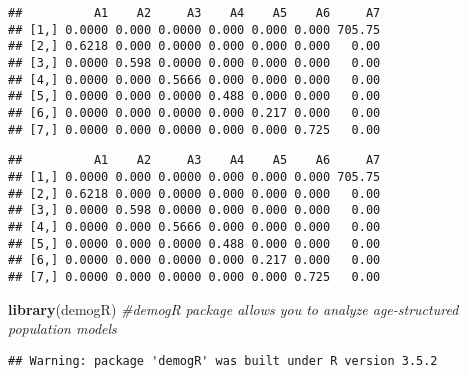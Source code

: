 \documentclass[]{article}
\newenvironment{Shaded}{\begin{snugshade}}{\end{snugshade}}
\newcommand{\KeywordTok}[1]{\textcolor[rgb]{0.13,0.29,0.53}{\textbf{#1}}}
\newcommand{\DecValTok}[1]{\textcolor[rgb]{0.00,0.00,0.81}{#1}}
\newcommand{\CommentTok}[1]{\textcolor[rgb]{0.56,0.35,0.01}{\textit{#1}}}
\newcommand{\OperatorTok}[1]{\textcolor[rgb]{0.81,0.36,0.00}{\textbf{#1}}}
\newcommand{\NormalTok}[1]{#1}
\begin{document}
\begin{verbatim}
##          A1    A2     A3    A4    A5    A6     A7
## [1,] 0.0000 0.000 0.0000 0.000 0.000 0.000 705.75
## [2,] 0.6218 0.000 0.0000 0.000 0.000 0.000   0.00
## [3,] 0.0000 0.598 0.0000 0.000 0.000 0.000   0.00
## [4,] 0.0000 0.000 0.5666 0.000 0.000 0.000   0.00
## [5,] 0.0000 0.000 0.0000 0.488 0.000 0.000   0.00
## [6,] 0.0000 0.000 0.0000 0.000 0.217 0.000   0.00
## [7,] 0.0000 0.000 0.0000 0.000 0.000 0.725   0.00
\end{verbatim}

\begin{Shaded}
\end{Shaded}

\begin{verbatim}
##          A1    A2     A3    A4    A5    A6     A7
## [1,] 0.0000 0.000 0.0000 0.000 0.000 0.000 705.75
## [2,] 0.6218 0.000 0.0000 0.000 0.000 0.000   0.00
## [3,] 0.0000 0.598 0.0000 0.000 0.000 0.000   0.00
## [4,] 0.0000 0.000 0.5666 0.000 0.000 0.000   0.00
## [5,] 0.0000 0.000 0.0000 0.488 0.000 0.000   0.00
## [6,] 0.0000 0.000 0.0000 0.000 0.217 0.000   0.00
## [7,] 0.0000 0.000 0.0000 0.000 0.000 0.725   0.00
\end{verbatim}

\begin{Shaded}
\begin{Highlighting}[]
\KeywordTok{library}\NormalTok{(demogR) }\CommentTok{#demogR package allows you to analyze age-structured population models}
\end{Highlighting}
\end{Shaded}

\begin{verbatim}
## Warning: package 'demogR' was built under R version 3.5.2
\end{verbatim}

\begin{Shaded}
\end{Shaded}
\end{document}
